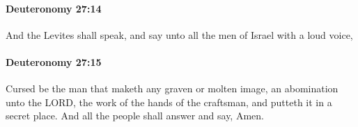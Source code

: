		\paragraph{Deuteronomy 27:14} %
			\label{DEUTERONOMY-27-14}

			And the Levites shall speak, and say unto all the men of Israel with a loud voice,


		\paragraph{Deuteronomy 27:15} %
			\label{DEUTERONOMY-27-15}

			Cursed be the man that maketh any graven or molten image, an abomination unto the LORD, the work of the hands of the craftsman, and putteth it in a secret place. And all the people shall answer and say, Amen.


